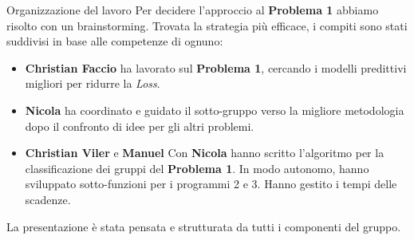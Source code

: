 \documentclass{beamer}
\begin{document}
\begin{frame}{Organizzazione del lavoro}
    Per decidere l'approccio al \textbf{Problema 1} abbiamo risolto con un brainstorming. 
    Trovata la strategia più efficace, i compiti sono stati suddivisi in base alle competenze di ognuno:

    \vspace{0.4cm}
    \begin{itemize}
        \item \textbf{Christian Faccio} ha lavorato sul \textbf{Problema 1}, cercando i modelli predittivi migliori per ridurre la \textit{Loss}.
        \item \textbf{Nicola} ha coordinato e guidato il sotto-gruppo verso la migliore metodologia dopo il confronto di idee per gli altri problemi.
        \item \textbf{Christian Viler} e \textbf{Manuel} Con \textbf{Nicola} hanno scritto l'algoritmo per la classificazione dei gruppi del \textbf{Problema 1}.
        In modo autonomo, hanno sviluppato sotto-funzioni per i programmi 2 e 3. Hanno gestito i tempi delle scadenze.
    \end{itemize}

    \vspace{0.4cm}
    La presentazione è stata pensata e strutturata da tutti i componenti del gruppo.
\end{frame}
\end{document}
